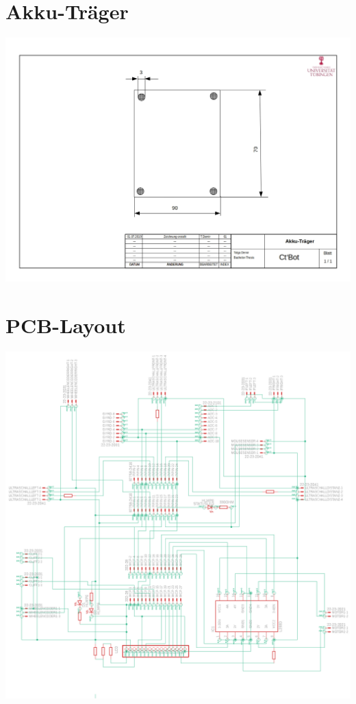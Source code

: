 \documentclass[twoside,12pt,a4paper]{report}
\begin{document}
	\section{Akku-Träger}
	\includegraphics[angle=90,origin=c, scale= 0.7]{images/Zeichnung_Akku.jpg}
	\section{PCB-Layout}
	\includegraphics[angle=0,origin=c, scale= 0.75]{images/Layout.png}
\end{document}
